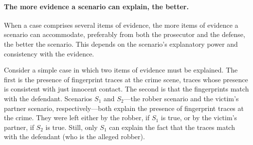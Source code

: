 \documentclass[10pt]{article}
\begin{document}
 


\paragraph{The more evidence a scenario can explain, the better.}

When a case comprises several items of evidence, 
 the more items of evidence a scenario can accommodate, preferably from both the prosecutor and the defense, 
 the better the scenario. This depends on the scenario's explanatory power and consistency with the evidence. 
 
 Consider a simple case in which two items of evidence must be explained. The first 
 is the presence of fingerprint traces at the crime scene, traces whose 
 presence is consistent with just innocent contact. The second is that the fingerprints match with the defendant. 
Scenarios $S_1$ and $S_2$---the robber scenario and the victim's 
partner scenario, respectively---both explain the presence of fingerprint traces at the crime. They were left either by 
the robber, if $S_1$ is true, or by the victim's partner, if $S_2$ is true. Still, 
only $S_1$ can explain the fact that the traces match with the defendant 
(who is the alleged robber). 
%
%
\end{document}
